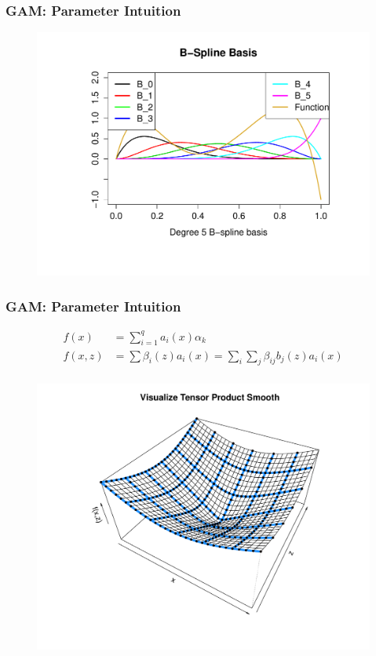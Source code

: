 \documentclass{beamer}
\begin{document}
\begin{frame}
\frametitle{GAM: Parameter Intuition}
\begin{figure}
\includegraphics[scale=.4]{figures/bSplineBasis}
\end{figure}

\end{frame}


\begin{frame}
\frametitle{GAM: Parameter Intuition}

\small{
\begin{align*}
 f(x)&=\sum \limits_{i=1}^q a_i(x) \alpha_k\\
f(x,z)&= \sum \beta_i(z) a_i(x) = \sum_i \sum_j \beta_{ij} b_j(z) a_i(x) \\
\end{align*}}
\vspace{-.3in}
\begin{figure}
\includegraphics[scale=.25]{figures/tensorProductViz}

\end{figure}

\end{frame}
\end{document}
